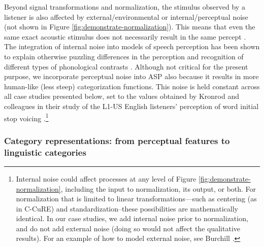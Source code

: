 \documentclass[
  11pt,
  man,floatsintext]{apa6}
\begin{document}
Beyond signal transformations and normalization, the stimulus observed by a listener is also affected by external/environmental or internal/perceptual noise (not shown in Figure \ref{fig:demonstrate-normalization}). This means that even the same exact acoustic stimulus does not necessarily result in the same percept \autocites{leonard2016}[p.~148]{nearey-hogan1986}{schuerman2022}. The integration of internal noise into models of speech perception has been shown to explain otherwise puzzling differences in the perception and recognition of different types of phonological contrasts \autocites[e.g.,][]{feldman2009,kronrod2016}. Although not critical for the present purpose, we incorporate perceptual noise into ASP also because it results in more human-like (less steep) categorization functions. This noise is held constant across all case studies presented below, set to the values obtained by Kronrod and colleagues in their study of the L1-US English listeners' perception of word initial stop voicing \autocite*[\(\sigma^2_{noise, VOT}=80 msec^2\), \(\sigma^2_{noise, spectral}=878 Mel^2\)]{kronrod2016}.\footnote{Internal noise could affect processes at any level of Figure \ref{fig:demonstrate-normalization}, including the input to normalization, its output, or both. For normalization that is limited to linear transformations---such as centering (as in C-CuRE) and standardization--these possibilities are mathematically identical. In our case studies, we add internal noise prior to normalization, and do not add external noise (doing so would not affect the qualitative results). For an example of how to model external noise, see Burchill \autocite*[Chapter 3]{burchill2023}.}

\subsubsection{Category representations: from perceptual features to linguistic categories}\label{sec:representations}
\end{document}
